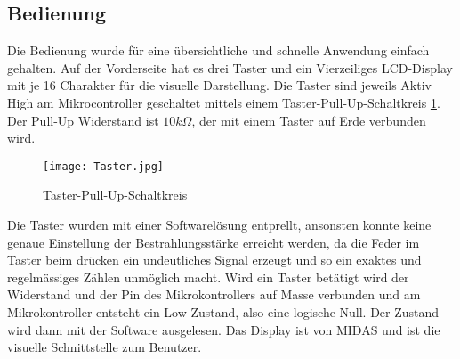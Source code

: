 \subsection{Bedienung}
Die Bedienung wurde für eine übersichtliche und schnelle Anwendung einfach gehalten. Auf der Vorderseite hat es drei Taster und ein Vierzeiliges LCD-Display mit je 16 Charakter für die visuelle Darstellung. Die Taster sind jeweils Aktiv High am Mikrocontroller geschaltet mittels einem Taster-Pull-Up-Schaltkreis \ref{fig:SwitchPullUp_Software}. Der Pull-Up Widerstand ist $10k\Omega$, der mit einem Taster auf Erde verbunden wird.

\begin{figure}[h]
	\centering
		\texttt{[image: Taster.jpg]}
	\caption{Taster-Pull-Up-Schaltkreis}
	\label{fig:SwitchPullUp_Software}
\end{figure}

Die Taster wurden mit einer Softwarelösung entprellt, ansonsten konnte keine genaue Einstellung der Bestrahlungsstärke erreicht werden, da die Feder im Taster beim drücken ein undeutliches Signal erzeugt und so ein exaktes und regelmässiges Zählen unmöglich macht. Wird ein Taster betätigt wird der Widerstand und der Pin des Mikrokontrollers auf Masse verbunden und am Mikrokontroller entsteht ein Low-Zustand, also eine logische Null. Der Zustand wird dann mit der Software ausgelesen.
\newline
Das Display ist von MIDAS und ist die visuelle Schnittstelle zum Benutzer.